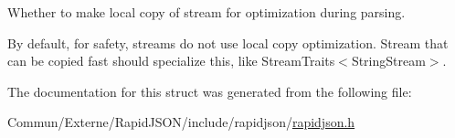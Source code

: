 Whether to make local copy of stream for optimization during parsing. 

By default, for safety, streams do not use local copy optimization. Stream that can be copied fast should specialize this, like Stream\+Traits$<$\+String\+Stream$>$. 

The documentation for this struct was generated from the following file\+:\begin{DoxyCompactItemize}
\item 
Commun/\+Externe/\+Rapid\+J\+S\+O\+N/include/rapidjson/\hyperlink{rapidjson_8h}{rapidjson.\+h}\end{DoxyCompactItemize}
